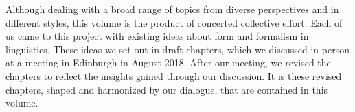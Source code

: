 \begin{refsection}
Although dealing with a broad range of topics from diverse perspectives and in different styles, this volume is the product of concerted collective effort. Each of us came to this project with existing ideas about form and formalism in linguistics. These ideas we set out in draft chapters, which we discussed in person at a meeting in Edinburgh in August 2018. After our meeting, we revised the chapters to reflect the insights gained through our discussion. It is these revised chapters, shaped and harmonized by our dialogue, that are contained in this volume. 

\printbibliography[heading=subbibliography]
\end{refsection}